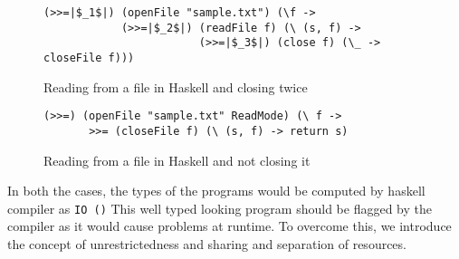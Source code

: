 \begin{figure}[h]
  \begin{framed}
    \begin{verbatim}
(>>=|$_1$|) (openFile "sample.txt") (\f ->
            (>>=|$_2$|) (readFile f) (\ (s, f) ->
                        (>>=|$_3$|) (close f) (\_ -> closeFile f)))
    \end{verbatim}
  \end{framed}
  \caption{Reading from a file in Haskell and closing twice}
  \label{fig:file-read-close-2times-desugared}
\end{figure}

\begin{figure}[h]
  \begin{framed}
\begin{verbatim}
(>>=) (openFile "sample.txt" ReadMode) (\ f ->
       >>= (closeFile f) (\ (s, f) -> return s)
\end{verbatim}
  \end{framed}
  \caption{Reading from a file in Haskell and not closing it}
  \label{fig:file-read-noclose-desugared}
\end{figure}

In both the cases, the types of the programs would be computed by haskell compiler as \texttt{IO ()}
This well typed looking program should be flagged by the compiler as it would cause problems at runtime.
To overcome this, we introduce the concept of unrestrictedness and sharing and separation of resources.

